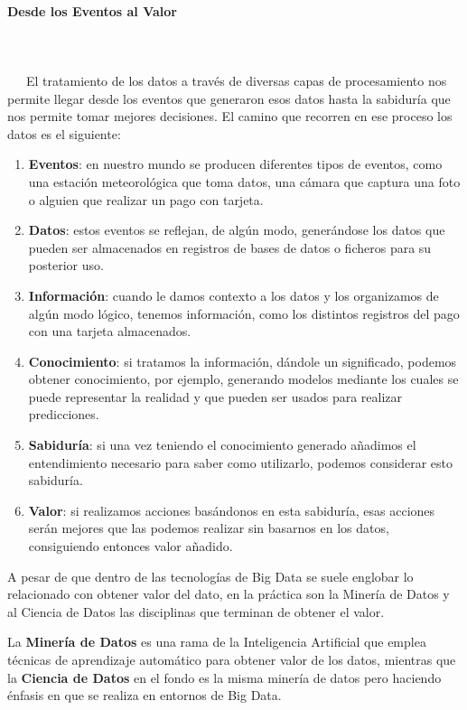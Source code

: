 \paragraph{Desde los Eventos al Valor}
~\\\\
\-\ \-\ \-\ El tratamiento de los datos a través de diversas capas de procesamiento nos permite llegar desde los eventos que generaron esos datos hasta la sabiduría que nos permite tomar mejores decisiones. El camino que recorren en ese proceso los datos es el siguiente:

\begin{enumerate}
	\item \textbf{Eventos}: en nuestro mundo se producen diferentes tipos de eventos, como una estación meteorológica que toma datos, una cámara que captura una foto o alguien que realizar un pago con tarjeta.
	\item \textbf{Datos}: estos eventos se reflejan, de algún modo, generándose los datos que pueden ser almacenados en registros de bases de datos o ficheros para su posterior uso.
	\item \textbf{Información}: cuando le damos contexto a los datos y los organizamos de algún modo lógico, tenemos información, como los distintos registros del pago con una tarjeta almacenados. 
	\item \textbf{Conocimiento}: si tratamos la información, dándole un significado, podemos obtener conocimiento, por ejemplo, generando modelos mediante los cuales se puede representar la realidad y que pueden ser usados para realizar predicciones.
	\item \textbf{Sabiduría}: si una vez teniendo el conocimiento generado añadimos el entendimiento necesario para saber como utilizarlo, podemos considerar esto sabiduría.
	\item \textbf{Valor}: si realizamos acciones basándonos en esta sabiduría, esas acciones serán mejores que las podemos realizar sin basarnos en los datos, consiguiendo entonces valor añadido.
\end{enumerate} 

A pesar de que dentro de las tecnologías de Big Data se suele englobar lo relacionado con obtener valor del dato, en la práctica son la Minería de Datos y al Ciencia de Datos las disciplinas que terminan de obtener el valor.

La \textbf{Minería de Datos} es una rama de la Inteligencia Artificial que emplea técnicas de aprendizaje automático para obtener valor de los datos, mientras que la \textbf{Ciencia de Datos} en el fondo es la misma minería de datos pero haciendo énfasis en que se realiza en entornos de Big Data.

